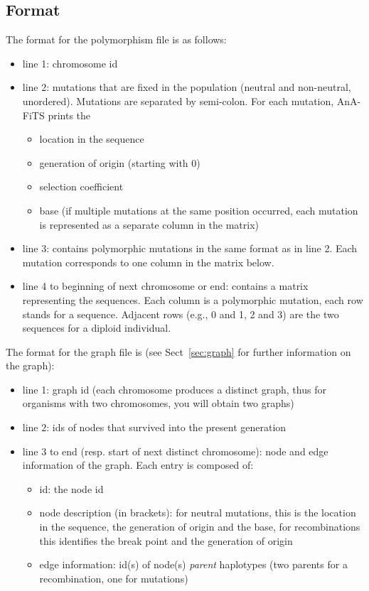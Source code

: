 \documentclass{scrartcl}
\begin{document}
\subsection{Format}

The format for the polymorphism file is as follows: 
\begin{itemize}
\item line 1: chromosome id 
\item line 2: mutations that are fixed in the population (neutral and non-neutral, unordered).
  Mutations are separated by semi-colon. For each mutation, AnA-FiTS
  prints the 
  \begin{itemize}
  \item location in the sequence
  \item generation of origin (starting  with 0)
  \item selection coefficient 
  \item base (if multiple mutations at the same position occurred,
    each mutation is represented as a separate column in the matrix)
  \end{itemize}
\item line 3: contains polymorphic mutations in the same format as in
  line 2. Each mutation corresponds to one column in the matrix
  below. 
\item line 4 to beginning of next chromosome or end: contains a matrix
  representing the sequences. Each column is a polymorphic mutation,
  each row stands for a sequence. Adjacent rows (e.g., 0 and 1, 2 and
  3) are the two sequences for a diploid individual. 
\end{itemize}


The format for the graph file is (see Sect~\ref{sec:graph} for further
information on the graph): 
\begin{itemize}
\item line 1: graph id (each chromosome produces a distinct graph,
  thus for organisms with two chromosomes, you will obtain two graphs)
\item line 2: ids of nodes that survived into the present generation
\item line 3 to end (resp. start of next distinct chromosome): node
  and edge information of the graph. Each entry is composed of: 
  \begin{itemize}
  \item id: the node id
  \item node description (in brackets): for neutral mutations, this is
    the location in the sequence, the generation of origin and the
    base, for recombinations this identifies the break point and the
    generation of origin
  \item edge information: id(s) of node(s) \textit{parent} haplotypes
    (two parents for a recombination, one for mutations)
  \end{itemize}   
\end{itemize}
\end{document}
